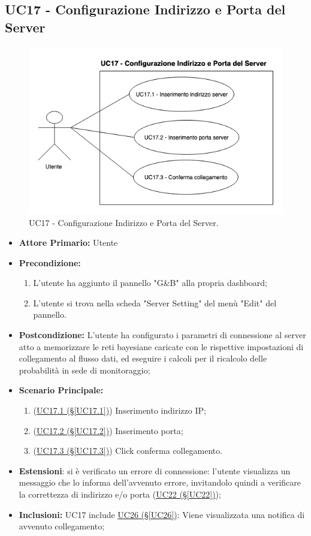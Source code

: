 \pagebreak

\subsection{UC17 - Configurazione Indirizzo e Porta del Server}\label{UC17}
\begin{figure}[H]
	\centering
	\includegraphics[scale=0.65]{./images/UC17.png}
	\caption{UC17 - Configurazione Indirizzo e Porta del Server.}
\end{figure}
\begin{itemize}
	\item \textbf{Attore Primario:}  Utente
	\item \textbf{Precondizione:}
		\begin{enumerate}
			\item L'utente ha aggiunto il pannello "G\&B" alla propria dashboard;
			\item L'utente si trova nella scheda "Server Setting" del menù "Edit" del pannello.
		\end{enumerate}
	\item \textbf{Postcondizione:} L'utente ha configurato i parametri di connessione al server atto a memorizzare le reti bayesiane caricate con le rispettive impostazioni di collegamento al flusso dati, ed eseguire i calcoli per il ricalcolo delle probabilità in sede di monitoraggio;
	\item \textbf{Scenario Principale:}
	\begin{enumerate}
		\item (\hyperref[UC17.1]{UC17.1 (§\ref*{UC17.1})}) Inserimento indirizzo IP;
		\item (\hyperref[UC17.2]{UC17.2 (§\ref*{UC17.2})}) Inserimento porta;
		\item (\hyperref[UC17.3]{UC17.3 (§\ref*{UC17.3})}) Click conferma collegamento.
	\end{enumerate}
	\item \textbf{Estensioni}: si è verificato un errore di connessione: l'utente visualizza un messaggio che lo informa dell'avvenuto errore, invitandolo quindi a verificare la correttezza di indirizzo e/o porta (\hyperref[UC22]{UC22 (§\ref*{UC22})});
	\item \textbf{Inclusioni:} UC17 include \hyperref[UC26]{UC26 (§\ref*{UC26})}: Viene visualizzata una notifica di avvenuto collegamento;
\end{itemize}

